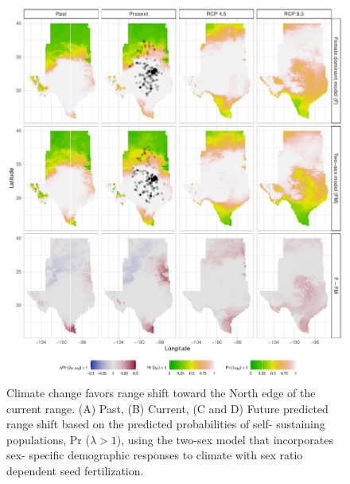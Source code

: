 \documentclass[12pt]{article}\usepackage[]{graphicx}\usepackage[dvipsnames]{xcolor}
\begin{document}

\begin{figure}[H]
	\begin{center}
		\includegraphics[width=0.95\linewidth]{Figures/Fig_geoPrlambda_ces.pdf}
		\caption{Climate change favors range shift toward the North edge of the current range.
			(A) Past, (B) Current, (C and D) Future predicted range shift based on the predicted probabilities of self- sustaining populations, Pr ($\lambda > 1$), using the two-sex model that incorporates sex- specific demographic responses to climate with sex ratio dependent seed fertilization.
}
\end{center}
\end{figure}
\end{document}
